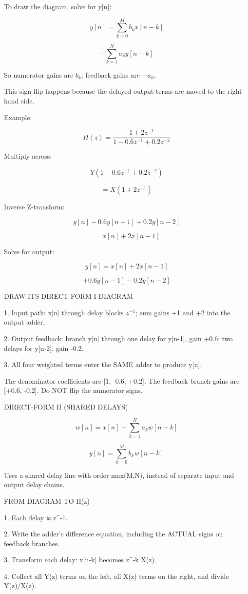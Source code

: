 To draw the diagram, solve for y[n]:

$$y[n]=\sum_{k=0}^{M}b_kx[n-k]$$

$$-\sum_{k=1}^{N}a_ky[n-k]$$

So numerator gains are $b_k$; feedback gains are $-a_k$.

This sign flip happens because the delayed output terms are moved to the right-hand side.

Example:

$$H(z)=\frac{1+2z^{-1}}{1-0.6z^{-1}+0.2z^{-2}}$$

Multiply across:

$$Y(1-0.6z^{-1}+0.2z^{-2})$$

$$=X(1+2z^{-1})$$

Inverse Z-transform:

$$y[n]-0.6y[n-1]+0.2y[n-2]$$

$$=x[n]+2x[n-1]$$

Solve for output:

$$y[n]=x[n]+2x[n-1]$$

$$+0.6y[n-1]-0.2y[n-2]$$

DRAW ITS DIRECT-FORM I DIAGRAM

1. Input path: x[n] through delay blocks $z^{-1}$; sum gains +1 and +2 into the output adder.

2. Output feedback: branch y[n] through one delay for y[n-1], gain +0.6; two delays for y[n-2], gain -0.2.

3. All four weighted terms enter the SAME adder to produce y[n].

The denominator coefficients are [1, -0.6, +0.2]. The feedback branch gains are [+0.6, -0.2]. Do NOT flip the numerator signs.

DIRECT-FORM II (SHARED DELAYS)

$$w[n]=x[n]-\sum_{k=1}^{N}a_kw[n-k]$$

$$y[n]=\sum_{k=0}^{M}b_kw[n-k]$$

Uses a shared delay line with order max(M,N), instead of separate input and output delay chains.

FROM DIAGRAM TO H(z)

1. Each delay is z^-1.

2. Write the adder's difference equation, including the ACTUAL signs on feedback branches.

3. Transform each delay: x[n-k] becomes z^-k X(z).

4. Collect all Y(z) terms on the left, all X(z) terms on the right, and divide Y(z)/X(z).

